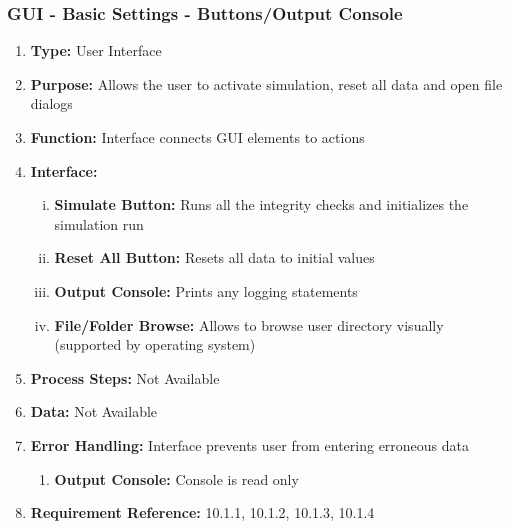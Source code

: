 \documentclass[paper=letter, fontsize=10pt]{scrartcl}
\numberwithin{equation}{section}		%
\numberwithin{figure}{section}			%
\numberwithin{table}{section}				%
\begin{document}
\subsubsection{GUI - Basic Settings - Buttons/Output Console}
\begin{enumerate}[]
	\item \textbf{Type:} User Interface
	\item \textbf{Purpose:} Allows the user to activate simulation, reset all data and open file dialogs
	\item \textbf{Function:} Interface connects GUI elements to actions
	\item \textbf{Interface:} 
	\begin{enumerate}[(i)]
		\item \textbf{Simulate Button:} Runs all the integrity checks and initializes the simulation run
		\item \textbf{Reset All Button:} Resets all data to initial values
		\item \textbf{Output Console:} Prints any logging statements
		\item \textbf{File/Folder Browse:} Allows to browse user directory visually (supported by operating system)
	\end{enumerate}
	\item \textbf{Process Steps:} Not Available
	\item \textbf{Data:} Not Available
	\item \textbf{Error Handling:} Interface prevents user from entering erroneous data 
	\begin{enumerate}[]
		\item \textbf{Output Console:} Console is read only
	\end{enumerate}
	\item \textbf{Requirement Reference:} 10.1.1, 10.1.2, 10.1.3, 10.1.4
\end{enumerate}
\end{document}
